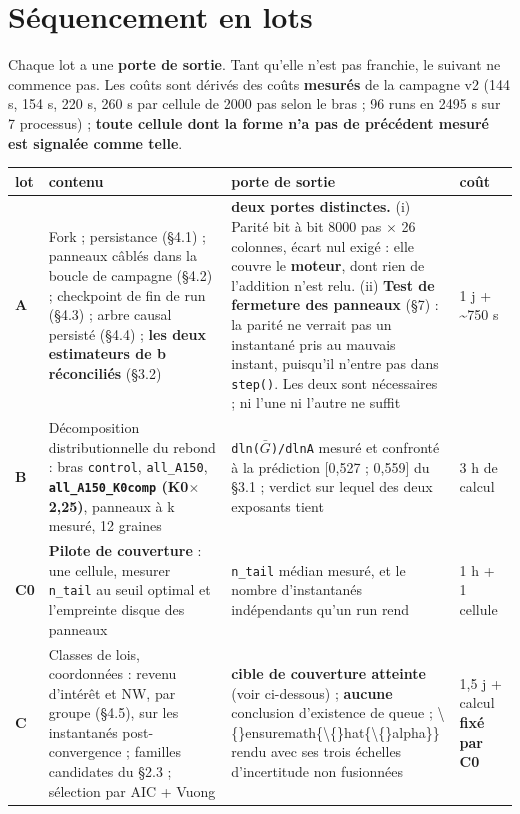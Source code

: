 \documentclass[11pt,a4paper]{article}
\newcommand{\code}[1]{\texttt{#1}}
\begin{document}
\bigskip

\setcounter{section}{4}
\section{Séquencement en lots}

Chaque lot a une \textbf{porte de sortie}. Tant qu'elle n'est pas franchie, le suivant ne commence pas. Les coûts sont dérivés des coûts \textbf{mesurés} de la campagne v2 (144 s, 154 s, 220 s, 260 s par cellule de 2000 pas selon le bras ; 96 runs en 2495 s sur 7 processus) ; \textbf{toute cellule dont la forme n'a pas de précédent mesuré est signalée comme telle}.

\begin{center}
\begin{tabularx}{\linewidth}{@{}lXXX@{}}
\toprule
\textbf{lot} & \textbf{contenu} & \textbf{porte de sortie} & \textbf{coût} \\
\midrule
\textbf{A} & Fork ; persistance (§4.1) ; panneaux câblés dans la boucle de campagne (§4.2) ; checkpoint de fin de run (§4.3) ; arbre causal persisté (§4.4) ; \textbf{les deux estimateurs de b réconciliés} (§3.2) & \textbf{deux portes distinctes.} (i) Parité bit à bit 8000 pas \ensuremath{\times} 26 colonnes, écart nul exigé : elle couvre le \textbf{moteur}, dont rien de l'addition n'est relu. (ii) \textbf{Test de fermeture des panneaux} (§7) : la parité ne verrait pas un instantané pris au mauvais instant, puisqu'il n'entre pas dans \code{step()}. Les deux sont nécessaires ; ni l'une ni l'autre ne suffit & 1 j + \textasciitilde{}750 s \\
\textbf{B} & Décomposition distributionnelle du rebond : bras \code{control}, \code{all\_A150}, \textbf{\code{all\_A150\_K0comp} (K0\ensuremath{\times}2,25)}, panneaux à k mesuré, 12 graines & \code{dln(\ensuremath{\bar{G}})/dlnA} mesuré et confronté à la prédiction [0,527 ; 0,559] du §3.1 ; verdict sur lequel des deux exposants tient & 3 h de calcul \\
\textbf{C0} & \textbf{Pilote de couverture} : une cellule, mesurer \code{n\_tail} au seuil optimal et l'empreinte disque des panneaux & \code{n\_tail} médian mesuré, et le nombre d'instantanés indépendants qu'un run rend & 1 h + 1 cellule \\
\textbf{C} & Classes de lois, coordonnées : revenu d'intérêt et NW, par groupe (§4.5), sur les instantanés post-convergence ; familles candidates du §2.3 ; sélection par AIC + Vuong & \textbf{cible de couverture atteinte} (voir ci-dessous) ; \textbf{aucune} conclusion d'existence de queue ; \textbackslash\{\}ensuremath\{\textbackslash\{\}hat\{\textbackslash\{\}alpha\}\} rendu avec ses trois échelles d'incertitude non fusionnées & 1,5 j + calcul \textbf{fixé par C0} \\

\end{tabularx}
\end{center}
\end{document}
